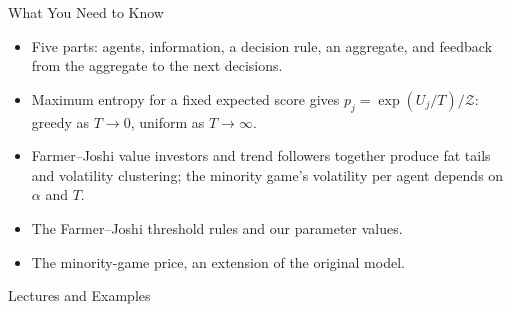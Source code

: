 \documentclass[aspectratio=169,11pt]{beamer}
\newcommand{\Zc}{\mathcal{Z}}
\newcommand{\repo}{https://github.com/varnerlab/CHEME-5660-CourseRepository-Fall-2026/blob/main/lectures/week-12/L12a}
\begin{document}
\begin{frame}{What You Need to Know}
  \vspace{0.3em}
  {\large\textbf{}}
  \begin{itemize}\setlength{\itemsep}{0.4em}
    \item Five parts: agents, information, a decision rule, an aggregate, and
      feedback from the aggregate to the next decisions.
    \item Maximum entropy for a fixed expected score gives
      $p_{j}=\exp(U_{j}/T)/\Zc$: greedy as $T\to 0$, uniform as $T\to\infty$.
    \item Farmer–Joshi value investors and trend followers together produce fat tails
      and volatility clustering; the minority game's volatility per agent depends on
      $\alpha$ and $T$.
  \end{itemize}

  \vspace{0.5em}
  {\large\textbf{} }
  \begin{itemize}\setlength{\itemsep}{0.3em}
    \item The Farmer–Joshi threshold rules and our parameter values.
    \item The minority-game price, an extension of the original model.
  \end{itemize}
\end{frame}

\begin{frame}{Lectures and Examples}
  \vspace{0.3em}
  {\normalsize\textbf{}\par\small
  \href{\repo/CHEME-5660-L12a-Lecture-AgentBasedMarkets-Fall-2026.ipynb}{}}

  \vspace{0.6em}
  {\normalsize\textbf{}\par\small
  \href{\repo/CHEME-5660-L12a-Example-FarmerJoshi-Fall-2026.ipynb}{}\par
  \href{\repo/CHEME-5660-L12a-Example-ThermalMinorityGame-Fall-2026.ipynb}{}}
\end{frame}
\end{document}
